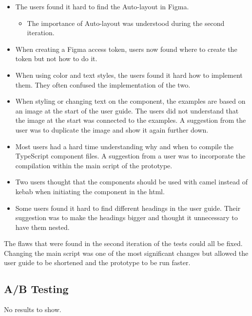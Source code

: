 \begin{itemize}
   \item The users found it hard to find the Auto-layout in Figma.
      \begin{itemize}
         \item The importance of Auto-layout was understood during the second iteration.
      \end{itemize}
   \item When creating a Figma access token, users now found where to create the token but not how to do it.
   \item When using color and text styles, the users found it hard how to implement them. They often confused the implementation of the two. 
   \item When styling or changing text on the component, the examples are based on an image at the start of the user guide. The users did not understand that the image at the start was connected to the examples. A suggestion from the user was to duplicate the image and show it again further down.
   \item Most users had a hard time understanding why and when to compile the TypeScript component files. A suggestion from a user was to incorporate the compilation within the main script of the prototype.
   \item Two users thought that the components should be used with \gls{camel} instead of \gls{kebab} when initiating the component in the \acrshort{html}.
   \item Some users found it hard to find different headings in the user guide. Their suggestion was to make the headings bigger and thought it unnecessary to have them nested.
\end{itemize}

The flaws that were found in the second iteration of the tests could all be fixed. Changing the main script was one of the most significant changes but allowed the user guide to be shortened and the prototype to be run faster.


\subsection{A/B Testing}%
\label{sub:A/B Testing}
No results to show. 


